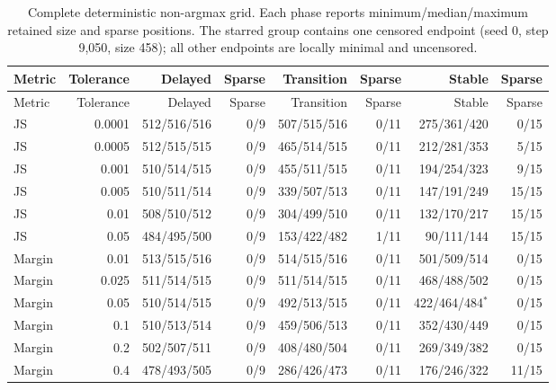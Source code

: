 \begingroup\small\setlength{\tabcolsep}{4pt}
\begin{longtable}{lr rr rr rr}
\caption{Complete deterministic non-argmax grid. Each phase reports minimum/median/maximum retained size and sparse positions. The starred group contains one censored endpoint (seed 0, step 9,050, size 458); all other endpoints are locally minimal and uncensored.}\label{tab:e5grid}\\
\toprule
Metric & Tolerance & Delayed & Sparse & Transition & Sparse & Stable & Sparse \\

\midrule\endfirsthead
\toprule
Metric & Tolerance & Delayed & Sparse & Transition & Sparse & Stable & Sparse \\

\midrule\endhead
\bottomrule\endfoot
JS & 0.0001 & 512/516/516 & 0/9 & 507/515/516 & 0/11 & 275/361/420 & 0/15 \\
JS & 0.0005 & 512/515/515 & 0/9 & 465/514/515 & 0/11 & 212/281/353 & 5/15 \\
JS & 0.001 & 510/514/515 & 0/9 & 455/511/515 & 0/11 & 194/254/323 & 9/15 \\
JS & 0.005 & 510/511/514 & 0/9 & 339/507/513 & 0/11 & 147/191/249 & 15/15 \\
JS & 0.01 & 508/510/512 & 0/9 & 304/499/510 & 0/11 & 132/170/217 & 15/15 \\
JS & 0.05 & 484/495/500 & 0/9 & 153/422/482 & 1/11 & 90/111/144 & 15/15 \\
Margin & 0.01 & 513/515/516 & 0/9 & 514/515/516 & 0/11 & 501/509/514 & 0/15 \\
Margin & 0.025 & 511/514/515 & 0/9 & 511/514/515 & 0/11 & 468/488/502 & 0/15 \\
Margin & 0.05 & 510/514/515 & 0/9 & 492/513/515 & 0/11 & 422/464/484$^{*}$ & 0/15 \\
Margin & 0.1 & 510/513/514 & 0/9 & 459/506/513 & 0/11 & 352/430/449 & 0/15 \\
Margin & 0.2 & 502/507/511 & 0/9 & 408/480/504 & 0/11 & 269/349/382 & 0/15 \\
Margin & 0.4 & 478/493/505 & 0/9 & 286/426/473 & 0/11 & 176/246/322 & 11/15 \\
\end{longtable}
\endgroup
